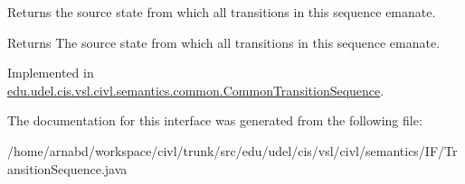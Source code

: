 Returns the source state from which all transitions in this sequence emanate. 

\begin{DoxyReturn}{Returns}
The source state from which all transitions in this sequence emanate. 
\end{DoxyReturn}


Implemented in \hyperlink{classedu_1_1udel_1_1cis_1_1vsl_1_1civl_1_1semantics_1_1common_1_1CommonTransitionSequence_aa9f72f08f445a998abbe752985b616e5}{edu.\+udel.\+cis.\+vsl.\+civl.\+semantics.\+common.\+Common\+Transition\+Sequence}.



The documentation for this interface was generated from the following file\+:\begin{DoxyCompactItemize}
\item 
/home/arnabd/workspace/civl/trunk/src/edu/udel/cis/vsl/civl/semantics/\+I\+F/Transition\+Sequence.\+java\end{DoxyCompactItemize}
